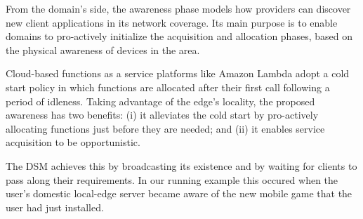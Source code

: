 From the domain's side, the awareness phase models how providers can discover new client applications in its network coverage. Its main purpose is to enable domains to pro-actively initialize the acquisition and allocation phases, based on the physical awareness of devices in the area. 

Cloud-based functions as a service platforms like Amazon Lambda adopt a cold start policy in which functions are allocated after their first call following a period of idleness. Taking advantage of the edge's locality, the proposed awareness has two benefits: (i) it alleviates the cold start by pro-actively allocating functions just before they are needed; and (ii) it enables service acquisition to be opportunistic.


The DSM achieves this by broadcasting its existence and by waiting for clients to pass along their requirements. In our running example this occured when the user's domestic local-edge server became aware of the new mobile game that the user had just installed. 



